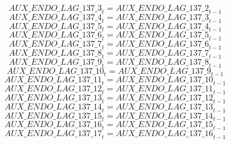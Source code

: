 \begin{dmath}
{AUX\_ENDO\_LAG\_137\_3}_{t}={AUX\_ENDO\_LAG\_137\_2}_{t-1}
\end{dmath}
\begin{dmath}
{AUX\_ENDO\_LAG\_137\_4}_{t}={AUX\_ENDO\_LAG\_137\_3}_{t-1}
\end{dmath}
\begin{dmath}
{AUX\_ENDO\_LAG\_137\_5}_{t}={AUX\_ENDO\_LAG\_137\_4}_{t-1}
\end{dmath}
\begin{dmath}
{AUX\_ENDO\_LAG\_137\_6}_{t}={AUX\_ENDO\_LAG\_137\_5}_{t-1}
\end{dmath}
\begin{dmath}
{AUX\_ENDO\_LAG\_137\_7}_{t}={AUX\_ENDO\_LAG\_137\_6}_{t-1}
\end{dmath}
\begin{dmath}
{AUX\_ENDO\_LAG\_137\_8}_{t}={AUX\_ENDO\_LAG\_137\_7}_{t-1}
\end{dmath}
\begin{dmath}
{AUX\_ENDO\_LAG\_137\_9}_{t}={AUX\_ENDO\_LAG\_137\_8}_{t-1}
\end{dmath}
\begin{dmath}
{AUX\_ENDO\_LAG\_137\_10}_{t}={AUX\_ENDO\_LAG\_137\_9}_{t-1}
\end{dmath}
\begin{dmath}
{AUX\_ENDO\_LAG\_137\_11}_{t}={AUX\_ENDO\_LAG\_137\_10}_{t-1}
\end{dmath}
\begin{dmath}
{AUX\_ENDO\_LAG\_137\_12}_{t}={AUX\_ENDO\_LAG\_137\_11}_{t-1}
\end{dmath}
\begin{dmath}
{AUX\_ENDO\_LAG\_137\_13}_{t}={AUX\_ENDO\_LAG\_137\_12}_{t-1}
\end{dmath}
\begin{dmath}
{AUX\_ENDO\_LAG\_137\_14}_{t}={AUX\_ENDO\_LAG\_137\_13}_{t-1}
\end{dmath}
\begin{dmath}
{AUX\_ENDO\_LAG\_137\_15}_{t}={AUX\_ENDO\_LAG\_137\_14}_{t-1}
\end{dmath}
\begin{dmath}
{AUX\_ENDO\_LAG\_137\_16}_{t}={AUX\_ENDO\_LAG\_137\_15}_{t-1}
\end{dmath}
\begin{dmath}
{AUX\_ENDO\_LAG\_137\_17}_{t}={AUX\_ENDO\_LAG\_137\_16}_{t-1}
\end{dmath}
